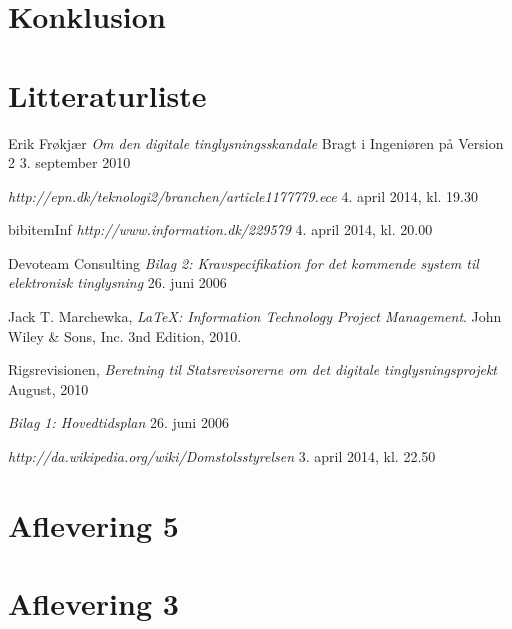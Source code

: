 \documentclass[10pt,a4paper,danish]{article}
\begin{document}
\section{Konklusion}


\section{Litteraturliste}
\begin{thebibliography}{9}

  Erik Frøkjær
  \emph{Om den digitale tinglysningsskandale}
  Bragt i Ingeniøren på Version 2
  3. september 2010

  \emph{http://epn.dk/teknologi2/branchen/article1177779.ece}
  4. april 2014, kl. 19.30

bibitem{Inf}
  \emph{http://www.information.dk/229579}
  4. april 2014, kl. 20.00

  Devoteam Consulting
  \emph{Bilag 2: Kravspecifikation for det kommende
  system til elektronisk tinglysning}
  26. juni 2006

  Jack T. Marchewka,
  \emph{\LaTeX: Information Technology Project Management}.
  John Wiley \& Sons, Inc.
  3nd Edition,
  2010.

  Rigsrevisionen,
  \emph{Beretning til Statsrevisorerne om det digitale   
  tinglysningsprojekt}
  August, 2010

  \emph{Bilag 1: Hovedtidsplan}
  26. juni 2006

  \emph{http://da.wikipedia.org/wiki/Domstolsstyrelsen}
  3. april 2014, kl. 22.50

\end{thebibliography}

\newpage
\appendix
\section{Aflevering 5}
   \label{app:vandfald}


\section{Aflevering 3}
\label{app:uge3}

\end{document}
